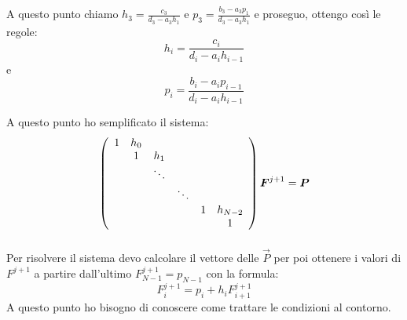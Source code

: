 A questo punto chiamo $h_3 = \frac{c_3}{d_3 -a_3 h_1}$ e $p_3=\frac{b_3-a_3p_1}{d_3 -a_3 h_1}$ e proseguo, ottengo cos\`i le regole:
\begin{equation}\label{eq:hi}
  h_i = \frac{c_i}{d_i -a_i h_{i-1}}
\end{equation}
e
\begin{equation}\label{eq:pi}
  p_i=\frac{b_i-a_ip_{i-1}}{d_i -a_i h_{i-1}}
\end{equation}

A questo punto ho semplificato il sistema:
\begin{equation}\end{equation}
$$\left( \begin{array}{cccccc}
    1	&h_0&	&	&	&\\
    &1	&h_1&	&	&\\
    &	&\ddots	&	&	&\\
    &	&	&\ddots	&	&\\
    &	&	&	&1	&h_{N-2}\\
    &	&	&	&	&1
\end{array} \right) \boldsymbol{F}^{j+1} = \boldsymbol{P}$$
\begin{equation}\end{equation}

Per risolvere il sistema devo calcolare il vettore delle $\vec{P}$ per poi ottenere i valori di $F^{j+1}$ a partire dall'ultimo $F_{N-1}^{j+1} = p_{N-1}$ con la formula:
\begin{equation}
  F_{i}^{j+1} = p_{i}+h_i F_{i+1}^{j+1}
\end{equation}
A questo punto ho bisogno di conoscere come trattare le condizioni al contorno.
